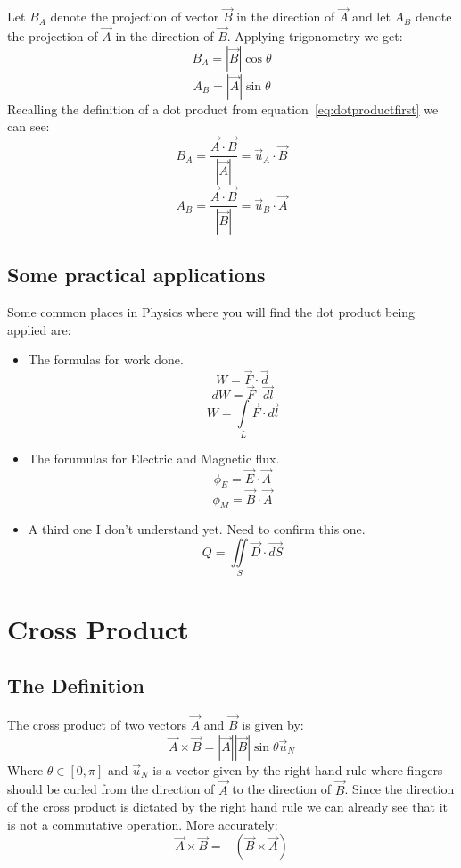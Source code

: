             \noindent Let $B_A$ denote the projection of vector $\vec{B}$ in the direction of $\vec{A}$ and let $A_B$ denote the projection of $\vec{A}$ in the direction of $\vec{B}$. Applying trigonometry we get:
            $$B_A = |\vec{B}|\cos\theta$$
            $$A_B = |\vec{A}|\sin\theta$$
            Recalling the definition of a dot product from equation~\ref{eq:dotproductfirst} we can see:
            $$B_A = \frac{\vec{A}\cdot\vec{B}}{|\vec{A}|} = \vec{u}_A\cdot\vec{B}$$
            $$A_B = \frac{\vec{A}\cdot\vec{B}}{|\vec{B}|} = \vec{u}_B\cdot\vec{A}$$
        
        \subsection{Some practical applications}
            Some common places in Physics where you will find the dot product being applied are:
            \begin{itemize}
                \item The formulas for work done.
                        $$W = \vec{F}\cdot \vec{d}$$ 
                        $$dW = \vec{F}\cdot \vec{dl}$$
                        $$W = \int\limits_{L} \vec{F}\cdot \vec{dl}$$
                \item The forumulas for Electric and Magnetic flux.
                        $$\phi_E = \vec{E}\cdot \vec{A}$$
                        $$\phi_M = \vec{B}\cdot \vec{A}$$
                \item A third one I don't understand yet. Need to confirm this one.
                        $$Q = \iint\limits_{S}\vec{D}\cdot \vec{dS}$$
            \end{itemize}
    \section{Cross Product}
        \subsection{The Definition}
            The cross product of two vectors $\vec{A}$ and $\vec{B}$ is given by:
            \begin{equation}\label{eq:crossproduct}
                \vec{A}\times \vec{B} = |\vec{A}||\vec{B}|\sin\theta \vec{u}_N
            \end{equation}
            Where $\theta\in\left[0, \pi\right]$ and $\vec{u}_N$ is a vector given by the right hand rule where fingers should be curled from the direction of $\vec{A}$ to the direction of $\vec{B}$.
            Since the direction of the cross product is dictated by the right hand rule we can already see that it is not a commutative operation. More accurately:
            \begin{equation}\label{eq:commutativeincrossproduct}
                \vec{A}\times\vec{B} = - (\vec{B}\times\vec{A})
            \end{equation}
            
